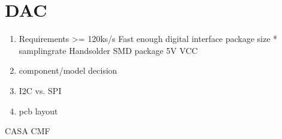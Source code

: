 \section{DAC}

\begin{enumerate}
  \item Requirements
  \subitem >= 120ks/s
  \subitem Fast enough digital interface
  \subsubitem package size * samplingrate
  \subitem Handsolder SMD package
  \subitem 5V VCC
  \item component/model decision
  \item I2C vs. SPI
  \item pcb layout
\end{enumerate}

\Gls{CASA}
\Gls{CMF}
